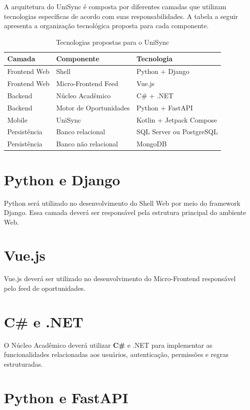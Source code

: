 \documentclass[12pt,oneside,a4paper,chapter=TITLE]{abntex2}
\begin{document}
A arquitetura do UniSync é composta por diferentes camadas que utilizam
tecnologias específicas de acordo com suas responsabilidades. A tabela
a seguir apresenta a organização tecnológica proposta para cada
componente.

\begin{table}[H]
\centering
\caption{Tecnologias propostas para o UniSync}
\begin{tabular}{lll}
\toprule
\textbf{Camada} & \textbf{Componente} & \textbf{Tecnologia} \\
\midrule
Frontend Web & Shell & Python + Django \\
Frontend Web & Micro-Frontend Feed & Vue.js \\
Backend & Núcleo Acadêmico & C\# + .NET \\
Backend & Motor de Oportunidades & Python + FastAPI \\
Mobile & UniSync & Kotlin + Jetpack Compose \\
Persistência & Banco relacional & SQL Server ou PostgreSQL \\
Persistência & Banco não relacional & MongoDB \\
\bottomrule
\end{tabular}
\end{table}

\section{Python e Django}

Python será utilizado no desenvolvimento do Shell Web por meio do
framework Django. Essa camada deverá ser responsável pela estrutura
principal do ambiente Web.

\section{Vue.js}

Vue.js deverá ser utilizado no desenvolvimento do Micro-Frontend
responsável pelo feed de oportunidades.

\section{C\# e .NET}

O Núcleo Acadêmico deverá utilizar \textbf{C\#} e .NET para implementar
as funcionalidades relacionadas aos usuários, autenticação, permissões
e regras estruturadas.

\section{Python e FastAPI}
\end{document}
